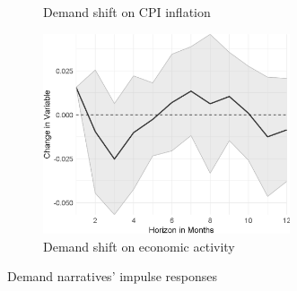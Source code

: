 \begin{figure}
\begin{subfigure}{00.24\textwidth}
		\caption{Demand shift on CPI inflation}
	\end{subfigure}
	\begin{subfigure}{00.24\textwidth}
		\includegraphics[width=0.8\textwidth]{output/lp/baseline/bHP/demand_shift/demand_shiftoneconac_djn.eps}
		\caption{Demand shift on economic activity}
	\end{subfigure}
	\caption{Demand narratives' impulse responses}
	\label{fig:irf_1}
\end{figure}
